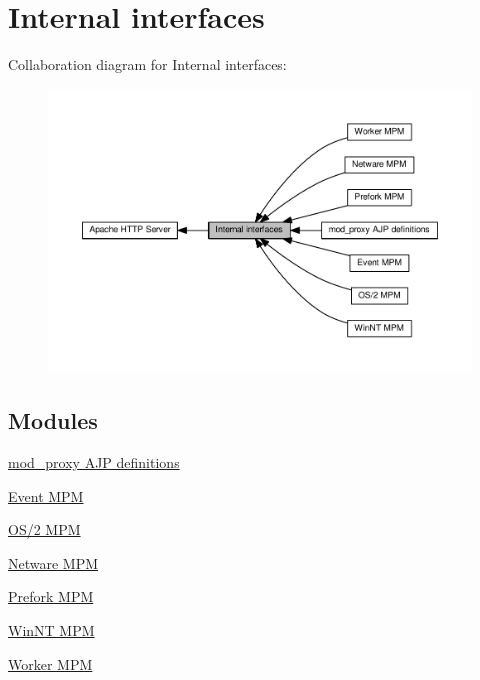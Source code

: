 \hypertarget{group__APACHE__INTERNAL}{}\section{Internal interfaces}
\label{group__APACHE__INTERNAL}
Collaboration diagram for Internal interfaces\+:
\nopagebreak
\begin{figure}[H]
\begin{center}
\leavevmode
\includegraphics[width=350pt]{group__APACHE__INTERNAL}
\end{center}
\end{figure}
\subsection*{Modules}
\begin{DoxyCompactItemize}
\item 
\hyperlink{group__AJP__defines}{mod\+\_\+proxy A\+J\+P definitions}
\item 
\hyperlink{group__APACHE__MPM__EVENT}{Event M\+PM}
\item 
\hyperlink{group__APACHE__MPM__OS2}{O\+S/2 M\+PM}
\item 
\hyperlink{group__APACHE__MPM__NETWARE}{Netware M\+PM}
\item 
\hyperlink{group__APACHE__MPM__PREFORK}{Prefork M\+PM}
\item 
\hyperlink{group__APACHE__MPM__WINNT}{Win\+N\+T M\+PM}
\item 
\hyperlink{group__APACHE__MPM__WORKER}{Worker M\+PM}
\end{DoxyCompactItemize}
